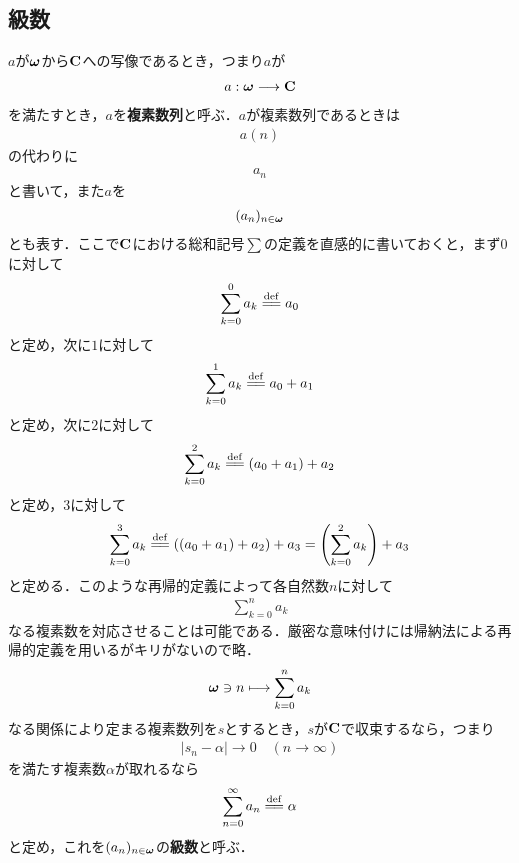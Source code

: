 \subsection{級数}
	
	$a$が${\boldsymbol \omega}$から$\mathbf{C}$への写像であるとき，つまり$a$が
	\begin{align}
		a: {\boldsymbol \omega} \longrightarrow \mathbf{C}
	\end{align}
	を満たすとき，$a$を{\bf 複素数列}と呼ぶ．$a$が複素数列であるときは
	\begin{align}
		a(n)
	\end{align}
	の代わりに
	\begin{align}
		a_n
	\end{align}
	と書いて，また$a$を
	\begin{align}
		(a_n)_{n \in {\boldsymbol \omega}}
	\end{align}
	とも表す．ここで$\mathbf{C}$における総和記号$\sum$の定義を直感的に書いておくと，まず$0$に対して
	\begin{align}
		\sum_{k=0}^0 a_k \defeq a_0
	\end{align}
	と定め，次に$1$に対して
	\begin{align}
		\sum_{k=0}^1 a_k \defeq a_0 + a_1
	\end{align}
	と定め，次に$2$に対して
	\begin{align}
		\sum_{k=0}^2 a_k \defeq (a_0 + a_1) + a_2
	\end{align}
	と定め，$3$に対して
	\begin{align}
		\sum_{k=0}^3 a_k \defeq ((a_0 + a_1) + a_2) + a_3 = \left(\sum_{k=0}^2 a_k\right) + a_3
	\end{align}
	と定める．このような再帰的定義によって各自然数$n$に対して
	\begin{align}
		\sum_{k=0}^n a_k
	\end{align}
	なる複素数を対応させることは可能である．厳密な意味付けには帰納法による再帰的定義を用いるがキリがないので略．
	\begin{align}
		{\boldsymbol \omega} \ni n \longmapsto \sum_{k=0}^n a_k
	\end{align}
	なる関係により定まる複素数列を$s$とするとき，$s$が$\mathbf{C}$で収束するなら，つまり
	\begin{align}
		|s_n - \alpha| \longrightarrow 0\quad (n \longrightarrow \infty)
	\end{align}
	を満たす複素数$\alpha$が取れるなら
	\begin{align}
		\sum_{n=0}^\infty a_n \defeq \alpha
	\end{align}
	と定め，これを$(a_n)_{n \in {\boldsymbol \omega}}$の{\bf 級数}と呼ぶ．
